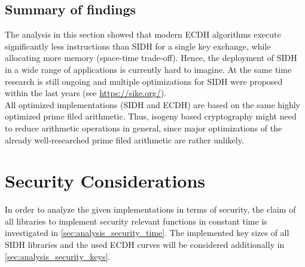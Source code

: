 \subsection{Summary of findings}
\label{sec:analysis_ecdh_sidh_findings}

The analysis in this section showed that modern \gls{ECDH} algorithms execute significantly less instructions than \gls{SIDH} for a single key exchange, while allocating more memory (space-time trade-off). Hence, the deployment of \gls{SIDH} in a wide range of applications is currently hard to imagine. At the same time research is still ongoing and multiple optimizations for \gls{SIDH} were proposed within the last years (see \url{https://sike.org/}).\\
All optimized implementations (\gls{SIDH} and \gls{ECDH}) are based on the same highly optimized prime filed arithmetic. Thus, isogeny based cryptography might need to reduce arithmetic operations in general, since major optimizations of the already well-researched prime filed arithmetic are rather unlikely.

\section{Security Considerations}\label{sec:analysis_security}

In order to analyze the given implementations in terms of security, the claim of all libraries to implement security relevant functions in constant time is investigated in \autoref{sec:analysis_security_time}. The implemented key sizes of all \gls{SIDH} libraries and the used \gls{ECDH} curves will be considered additionally in \autoref{sec:analysis_security_keys}.

